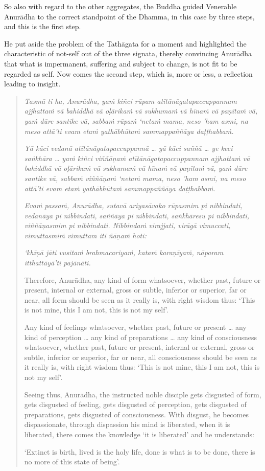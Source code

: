 So also with regard to the other aggregates, the Buddha guided Venerable Anurādha to the correct standpoint of the Dhamma, in this case by three steps, and this is the first step.

He put aside the problem of the Tathāgata for a moment and highlighted the characteristic of not-self out of the three signata, thereby convincing Anurādha that what is impermanent, suffering and subject to change, is not fit to be regarded as self. Now comes the second step, which is, more or less, a reflection leading to insight.

\begin{quote}
\emph{Tasmā ti ha, Anurādha, yaṁ kiñci rūpam atītānāgatapaccuppannam ajjhattaṁ vā bahiddhā vā oḷārikaṁ vā sukhumaṁ vā hīnaṁ vā paṇītaṁ vā, yaṁ dūre santike vā, sabbaṁ rūpaṁ `netaṁ mama, neso 'ham asmi, na meso attā'ti evam etaṁ yathābhūtaṁ sammappaññāya daṭṭhabbaṁ.}

\emph{Yā kāci vedanā atītānāgatapaccuppannā \ldots{} yā kāci saññā \ldots{} ye keci saṅkhāra \ldots{} yaṁ kiñci viññāṇaṁ atītānāgatapaccuppannam ajjhattaṁ vā bahiddhā vā oḷārikaṁ vā sukhumaṁ vā hīnaṁ vā paṇītaṁ vā, yaṁ dūre santike vā, sabbaṁ viññāṇaṁ `netaṁ mama, neso 'ham asmi, na meso attā'ti evam etaṁ yathābhūtaṁ sammappaññāya daṭṭhabbaṁ.}

\emph{Evaṁ passaṁ, Anurādha, sutavā ariyasāvako rūpasmim pi nibbindati, vedanāya pi nibbindati, saññāya pi nibbindati, saṅkhāresu pi nibbindati, viññāṇasmim pi nibbindati. Nibbindaṁ virajjati, virāgā vimuccati, vimuttasmiṁ vimuttam iti ñāṇaṁ hoti:}

\emph{`khīṇā jāti vusitaṁ brahmacariyaṁ, kataṁ karaṇīyaṁ, nāparam itthattāyā'ti pajānāti.}

Therefore, Anurādha, any kind of form whatsoever, whether past, future or present, internal or external, gross or subtle, inferior or superior, far or near, all form should be seen as it really is, with right wisdom thus: `This is not mine, this I am not, this is not my self'.

Any kind of feelings whatsoever, whether past, future or present \ldots{} any kind of perception \ldots{} any kind of preparations \ldots{} any kind of consciousness whatsoever, whether past, future or present, internal or external, gross or subtle, inferior or superior, far or near, all consciousness should be seen as it really is, with right wisdom thus: `This is not mine, this I am not, this is not my self'.

Seeing thus, Anurādha, the instructed noble disciple gets disgusted of form, gets disgusted of feeling, gets disgusted of perception, gets disgusted of preparations, gets disgusted of consciousness. With disgust, he becomes dispassionate, through dispassion his mind is liberated, when it is liberated, there comes the knowledge `it is liberated' and he understands:

`Extinct is birth, lived is the holy life, done is what is to be done, there is no more of this state of being'.
\end{quote}

